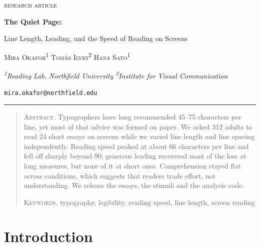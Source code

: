 \documentclass[11pt]{article}
\begin{document}
\thispagestyle{empty}
\begin{center}
  {\color{accent}\footnotesize\scshape research article}\par\vspace{10pt}
  {\LARGE\bfseries The Quiet Page:\par}\vspace{4pt}
  {\Large Line Length, Leading, and the Speed of Reading on Screens\par}
  \vspace{16pt}
  {\scshape Mira Okafor}\textsuperscript{1}\quad\textperiodcentered\quad
  {\scshape Tomás Ilves}\textsuperscript{2}\quad\textperiodcentered\quad
  {\scshape Hana Sato}\textsuperscript{1}\par
  \vspace{6pt}
  {\footnotesize\itshape
    \textsuperscript{1}Reading Lab, Northfield University \qquad
    \textsuperscript{2}Institute for Visual Communication\par
    \textup{\texttt{mira.okafor@northfield.edu}}\par}
  \vspace{14pt}
  {\color{ink}\rule{3cm}{.6pt}}
\end{center}

\begin{quote}
  \small
  \noindent\textsc{\color{ink}Abstract.}\enspace
  Typographers have long recommended 45--75 characters per line, yet most of
  that advice was formed on paper. We asked 312 adults to read 24 short essays on
  screens while we varied line length and line spacing independently. Reading
  speed peaked at about 66 characters per line and fell off sharply beyond 90;
  generous leading recovered most of the loss at long measures, but none of it
  at short ones. Comprehension stayed flat across conditions, which suggests that
  readers trade effort, not understanding. We release the essays, the stimuli and
  the analysis code.

  \vspace{6pt}\noindent\textsc{\color{ink}Keywords.}\enspace
  typography, legibility, reading speed, line length, screen reading
\end{quote}
\vspace{6pt}

\section{Introduction}
\end{document}
